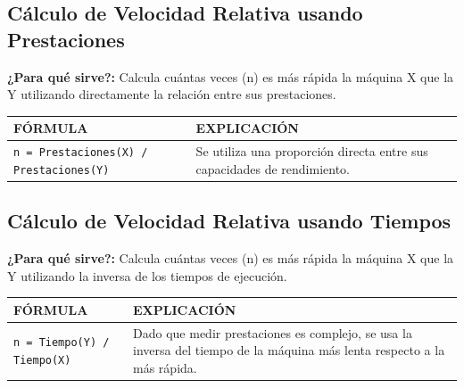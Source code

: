 \documentclass[12pt,letterpaper]{article}
\begin{document}
\subsection{Cálculo de Velocidad Relativa usando Prestaciones}
\textbf{¿Para qué sirve?:} Calcula cuántas veces (n) es más rápida la máquina X que la Y utilizando directamente la relación entre sus prestaciones.

\begin{table}[H]
    \centering
    \begin{tabularx}{\textwidth}{|l|X|}\hline
         \textbf{FÓRMULA} & \textbf{EXPLICACIÓN} \\\hline
         \texttt{n = Prestaciones(X) / Prestaciones(Y)} & Se utiliza una proporción directa entre sus capacidades de rendimiento. \\ \hline
    \end{tabularx}    
\end{table}

\subsection{Cálculo de Velocidad Relativa usando Tiempos}
\textbf{¿Para qué sirve?:} Calcula cuántas veces (n) es más rápida la máquina X que la Y utilizando la inversa de los tiempos de ejecución.

\begin{table}[H]
    \centering
    \begin{tabularx}{\textwidth}{|l|X|}\hline
         \textbf{FÓRMULA} & \textbf{EXPLICACIÓN} \\\hline
         \texttt{n = Tiempo(Y) / Tiempo(X)} & Dado que medir prestaciones es complejo, se usa la inversa del tiempo de la máquina más lenta respecto a la más rápida. \\ \hline
    \end{tabularx}    
\end{table}
\end{document}

